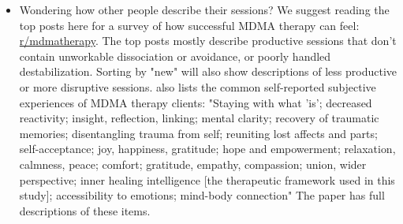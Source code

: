 \documentclass[12pt,letterpaper]{book}
\begin{document}
\begin{itemize}
    \item Wondering how other people describe their sessions? We suggest reading the top posts here for a survey of how successful MDMA therapy can feel: \href{https://old.reddit.com/r/mdmatherapy/top/?sort=top&t=all}{r/mdmatherapy}. The top posts mostly describe productive sessions that don't contain unworkable dissociation or avoidance, or poorly handled destabilization. Sorting by "new" will also show descriptions of less productive or more disruptive sessions. \textcite{godes2023perceived} also lists the common self-reported subjective experiences of MDMA therapy clients: "Staying with what 'is'; decreased reactivity; insight, reflection, linking; mental clarity; recovery of traumatic memories; disentangling trauma from self; reuniting lost affects and parts; self-acceptance; joy, happiness, gratitude; hope and empowerment; relaxation, calmness, peace; comfort; gratitude, empathy, compassion; union, wider perspective; inner healing intelligence [the therapeutic framework used in this study]; accessibility to emotions; mind-body connection" The paper has full descriptions of these items.
\end{itemize}
\end{document}
